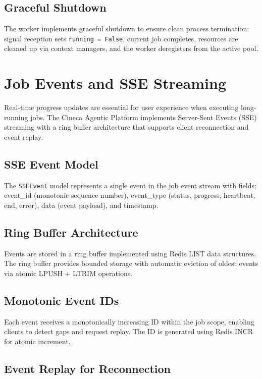 \documentclass[a4paper,twoside]{sapthesis}
\begin{document}
\subsection{Graceful Shutdown}

The worker implements graceful shutdown to ensure clean process termination: signal reception sets \texttt{running = False}, current job completes, resources are cleaned up via context managers, and the worker deregisters from the active pool.

\section{Job Events and SSE Streaming}
\label{sec:job-events}

Real-time progress updates are essential for user experience when executing long-running jobs. The Cineca Agentic Platform implements Server-Sent Events (SSE) streaming with a ring buffer architecture that supports client reconnection and event replay.

\subsection{SSE Event Model}

The \texttt{SSEEvent} model represents a single event in the job event stream with fields: event\_id (monotonic sequence number), event\_type (status, progress, heartbeat, end, error), data (event payload), and timestamp.

\subsection{Ring Buffer Architecture}

Events are stored in a ring buffer implemented using Redis LIST data structures. The ring buffer provides bounded storage with automatic eviction of oldest events via atomic LPUSH + LTRIM operations.

\subsection{Monotonic Event IDs}

Each event receives a monotonically increasing ID within the job scope, enabling clients to detect gaps and request replay. The ID is generated using Redis INCR for atomic increment.

\subsection{Event Replay for Reconnection}
\end{document}
